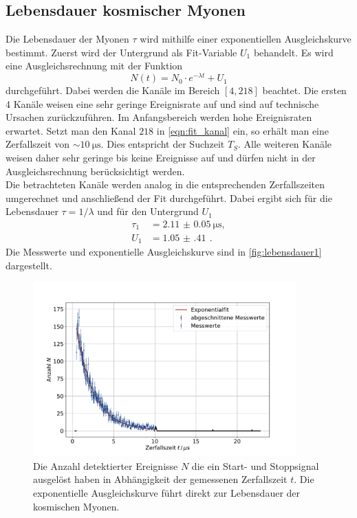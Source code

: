 \subsection{Lebensdauer kosmischer Myonen}
Die Lebensdauer der Myonen $\tau$ wird mithilfe einer exponentiellen Ausgleichskurve bestimmt.
Zuerst wird der Untergrund als Fit-Variable $U_1$ behandelt.
Es wird eine Ausgleichsrechnung mit der Funktion
\begin{equation}
    N(t) = N_0 \cdot e^{- \lambda t} + U_1
\end{equation}
durchgeführt.
Dabei werden die Kanäle im Bereich $[4, 218]$ beachtet.
Die ersten 4 Kanäle weisen eine sehr geringe Ereignisrate auf und sind auf technische Ursachen zurückzuführen.
Im Anfangsbereich werden hohe Ereignisraten erwartet.
Setzt man den Kanal $218$ in \autoref{eqn:fit_kanal} ein, so erhält man eine Zerfallszeit von $\sim \qty{10}{\micro\second}$.
Dies entspricht der Suchzeit $T_S$.
Alle weiteren Kanäle weisen daher sehr geringe bis keine Ereignisse auf und dürfen nicht in der Ausgleichsrechnung berücksichtigt werden.
\\
Die betrachteten Kanäle werden analog in die entsprechenden Zerfallszeiten umgerechnet und anschließend der Fit durchgeführt.
Dabei ergibt sich für die Lebensdauer $\tau = 1/\lambda$ und für den Untergrund $U_1$
\begin{align}
    \tau_1 &= \qty{2.11(5)}{\micro\second},\\
    U_1 &= \qty{1.05(41)}{} \,.
\end{align}
Die Messwerte und exponentielle Ausgleichskurve sind in \autoref{fig:lebensdauer1} dargestellt.
\begin{figure}
    \centering
    \includegraphics[width=0.9\textwidth]{content/plots/lifetime.pdf}
    \caption{Die Anzahl detektierter Ereignisse $N$ die ein Start- und Stoppsignal ausgelöst haben in Abhängigkeit der gemessenen Zerfallszeit $t$.
    Die exponentielle Ausgleichskurve führt direkt zur Lebensdauer der kosmischen Myonen.
    }
    \label{fig:lebensdauer1}
\end{figure}
